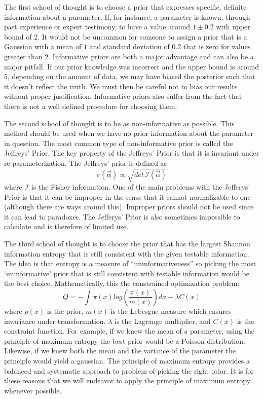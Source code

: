 \documentclass[12pt]{article}
\numberwithin{equation}{section}
\begin{document}
The first school of thought is to choose a prior that expresses specific, definite information about a parameter.
If, for instance, a parameter is known, through past experience or expert testimony, to have a value 
around $1 \pm 0.2$ with upper bound of $2$. It would not be uncommon for someone to assign a prior that is a Gaussian with a mean of 
$1$ and standard deviation of $0.2$ that is zero for values greater than $2$. Informative priors are both a major advantage and can 
also be a major pitfall. If our prior knowledge was incorrect and the upper bound is around $5$, depending on the amount of data, we 
may have biased the posterior such that it doesn't reflect the truth. We must then be careful not to bias our results without proper 
justification. Informative priors also suffer from the fact that there is not a well defined procedure for choosing them. 

The second school of thought is to be as non-informative as possible. This method should 
be used when we have no prior information about the parameter in question. The most common type of non-informative prior 
is called the Jeffreys' Prior. The key property of the Jeffreys' Prior is that it is invariant under re-parameterization. 
The Jeffreys' prior is defined as 
\begin{equation} \label{eq:jefferys}
	\pi(\vec{\alpha}) \propto \sqrt{det \,\mathcal{I}(\vec{\alpha})}
\end{equation}
where $\mathcal{I}$ is the Fisher information. One of the main problems with the Jefferys' Prior is that it can be 
improper in the sense that it cannot normalizable to one (although there are ways around this). Improper priors should 
not be used since it can lead to paradoxes.\cite{von2011bayesian}
The Jefferys' Prior is also sometimes impossible to calculate and is therefore of limited use.

The third school of thought is to choose the prior that has the largest Shannon information entropy that is still consistent with the 
given testable information. The idea is that entropy is a measure of ``uninformativeness'' so picking the most `uninformative' prior 
that is still consistent with testable information would be the best choice. Mathematically, this the constrained optimization 
problem:
\begin{equation} \label{eq:maxent}
	Q = -\int \pi(x) log(\frac{\pi(x)}{m(x)})dx - \lambda C(x) 
\end{equation}
where $p(x)$ is the prior, $m(x)$ is the Lebesgue measure which ensures invariance under transformation, $\lambda$ is the Lagrange 
multiplier, and $C(x)$ is the constraint function. For example, if we knew the mean of a parameter, using the 
principle of maximum entropy the best prior would be a Poisson distribution. Likewise, if we knew both the mean and the variance of 
the parameter the principle would yield a gaussian. The principle of maximum entropy provides a balanced and systematic approach to 
problem of picking the right prior. It is for these reasons that we will endeavor to apply the principle of maximum entropy 
whenever possible.   
\end{document}
